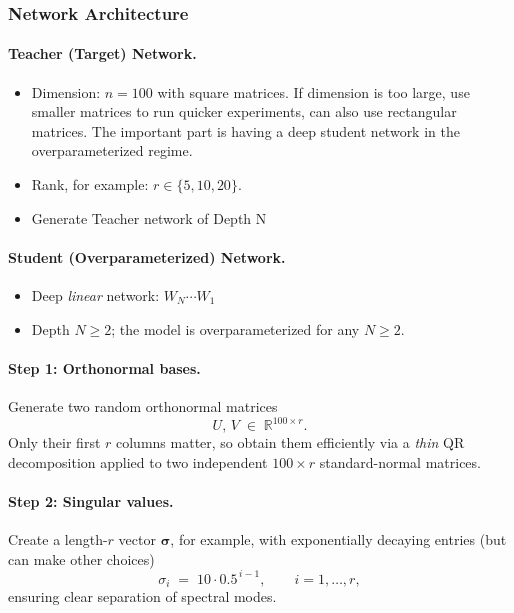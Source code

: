 \documentclass[11pt]{article}
\newcommand{\Wprod}{\ensuremath{W_N\cdots W_1}}
\begin{document}
\subsubsection*{Network Architecture}

\paragraph*{Teacher (Target) Network.}
\begin{itemize}[nosep]
  \item Dimension: \(n = 100\) with square matrices. If dimension is too large, use smaller matrices to run quicker experiments, can also use rectangular matrices. The important part is having a deep student network in the overparameterized regime.
  \item Rank, for example: \(r \in \{5,10,20\}\).
  \item Generate Teacher network of Depth N
\end{itemize}

\paragraph*{Student (Overparameterized) Network.}
\begin{itemize}[nosep]
  \item Deep \emph{linear} network: \(\Wprod\)
  \item Depth \(N\ge2\); the model is overparameterized for any \(N\ge2\).
\end{itemize}

\paragraph{Step 1: Orthonormal bases.}
Generate two random orthonormal matrices
\[
  U,\,V \;\in\; \mathbb{R}^{100\times r}.
\]
Only their first \(r\) columns matter, so obtain them efficiently via a
\emph{thin} QR decomposition applied to two independent \(100\times r\)
standard-normal matrices.

\paragraph{Step 2: Singular values.}
Create a length-\(r\) vector \(\boldsymbol{\sigma}\), for example, with exponentially
decaying entries (but can make other choices)
\[
  \sigma_i \;=\; 10 \cdot 0.5^{\,i-1},
  \qquad i = 1,\dots,r,
\]
ensuring clear separation of spectral modes.
\end{document}
